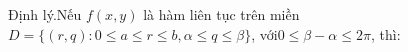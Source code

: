 \documentclass[preview]{standalone}
\begin{document}
\begin{center}
Định lý.Nếu $f(x, y)$ là hàm liên tục trên miền $D = \{(r, q): 0 \leq a \leq r \leq b, \alpha \leq q \leq \beta\}$, với$0 \leq \beta - \alpha \leq 2\pi$, thì:
\end{center}
\end{document}
